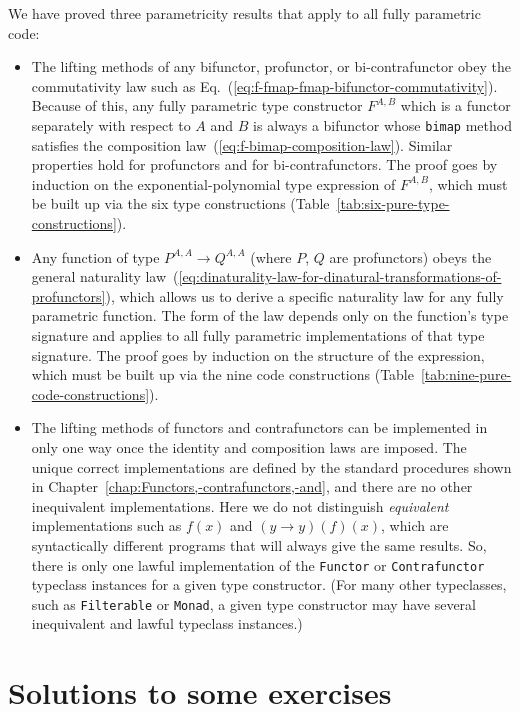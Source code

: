 We have proved three parametricity results that apply to all fully
parametric code:
\begin{itemize}
\item The lifting methods of any bifunctor, profunctor, or bi-contrafunctor
obey the commutativity law such as Eq.~(\ref{eq:f-fmap-fmap-bifunctor-commutativity}).
Because of this, any fully parametric type constructor $F^{A,B}$
which is a functor separately with respect to $A$ and $B$ is always
a bifunctor whose \lstinline!bimap! method satisfies the composition
law~(\ref{eq:f-bimap-composition-law}). Similar properties hold
for profunctors and for bi-contrafunctors. The proof goes by induction
on the exponential-polynomial type expression of $F^{A,B}$, which
must be built up via the six type constructions (Table~\ref{tab:six-pure-type-constructions}).
\item Any function of type $P^{A,A}\rightarrow Q^{A,A}$ (where $P$, $Q$
are profunctors) obeys the general naturality law~(\ref{eq:dinaturality-law-for-dinatural-transformations-of-profunctors}),
which allows us to derive a specific naturality law for any fully
parametric function. The form of the law depends only on the function\textsf{'}s
type signature and applies to all fully parametric implementations
of that type signature. The proof goes by induction on the structure
of the expression, which must be built up via the nine code constructions
(Table~\ref{tab:nine-pure-code-constructions}).
\item The lifting methods of functors and contrafunctors can be implemented
in only one way once the identity and composition laws are imposed.
The unique correct implementations are defined by the standard procedures
shown in Chapter~\ref{chap:Functors,-contrafunctors,-and}, and there
are no other inequivalent implementations. Here we do not distinguish
\emph{equivalent} implementations such as $f(x)$ and $(y\rightarrow y)(f)(x)$,
which are syntactically different programs that will always give the
same results. So, there is only one lawful implementation of the \lstinline!Functor!
or \lstinline!Contrafunctor! typeclass instances for a given type
constructor. (For many other typeclasses, such as \lstinline!Filterable!
or \lstinline!Monad!, a given type constructor may have several inequivalent
and lawful typeclass instances.)
\end{itemize}

\chapter{Solutions to some exercises}

